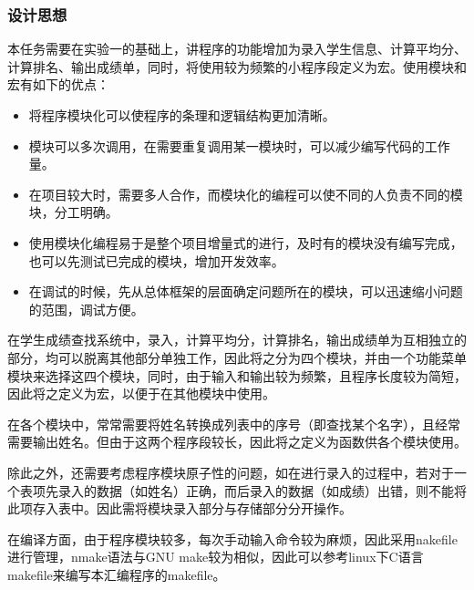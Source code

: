 \documentclass{article}
\begin{document}
	\subsubsection{设计思想}
	本任务需要在实验一的基础上，讲程序的功能增加为录入学生信息、计算平均分、计算排名、输出成绩单，同时，将使用较为频繁的小程序段定义为宏。使用模块和宏有如下的优点：
	\begin{itemize}
		\item 将程序模块化可以使程序的条理和逻辑结构更加清晰。
		\item 模块可以多次调用，在需要重复调用某一模块时，可以减少编写代码的工作量。
		\item 在项目较大时，需要多人合作，而模块化的编程可以使不同的人负责不同的模块，分工明确。
		\item 使用模块化编程易于是整个项目增量式的进行，及时有的模块没有编写完成，也可以先测试已完成的模块，增加开发效率。
		\item 在调试的时候，先从总体框架的层面确定问题所在的模块，可以迅速缩小问题的范围，调试方便。
	\end{itemize}
	在学生成绩查找系统中，录入，计算平均分，计算排名，输出成绩单为互相独立的部分，均可以脱离其他部分单独工作，因此将之分为四个模块，并由一个功能菜单模块来选择这四个模块，同时，由于输入和输出较为频繁，且程序长度较为简短，因此将之定义为宏，以便于在其他模块中使用。\par
	在各个模块中，常常需要将姓名转换成列表中的序号（即查找某个名字），且经常需要输出姓名。但由于这两个程序段较长，因此将之定义为函数供各个模块使用。 \par
	除此之外，还需要考虑程序模块原子性的问题，如在进行录入的过程中，若对于一个表项先录入的数据（如姓名）正确，而后录入的数据（如成绩）出错，则不能将此项存入表中。因此需将模块录入部分与存储部分分开操作。\par
	在编译方面，由于程序模块较多，每次手动输入命令较为麻烦，因此采用nakefile进行管理，nmake语法与GNU make较为相似，因此可以参考linux下C语言makefile来编写本汇编程序的makefile。
\end{document}
